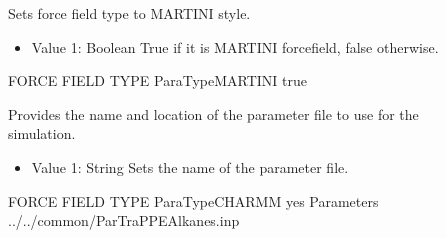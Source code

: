 \documentclass[letterpaper,10pt,english]{sphinxmanual}
\begin{document}
\begin{description}
\item[{}] \leavevmode
Sets force field type to MARTINI style.
\begin{itemize}
\item {} 
Value 1: Boolean \sphinxhyphen{} True if it is MARTINI forcefield, false otherwise.

\end{itemize}

\begin{sphinxVerbatim}[commandchars=\\\{\}]
\PYGZsh{}\PYGZsh{}\PYGZsh{}\PYGZsh{}\PYGZsh{}\PYGZsh{}\PYGZsh{}\PYGZsh{}\PYGZsh{}\PYGZsh{}\PYGZsh{}\PYGZsh{}\PYGZsh{}\PYGZsh{}\PYGZsh{}\PYGZsh{}\PYGZsh{}\PYGZsh{}\PYGZsh{}\PYGZsh{}\PYGZsh{}\PYGZsh{}\PYGZsh{}\PYGZsh{}\PYGZsh{}\PYGZsh{}\PYGZsh{}\PYGZsh{}\PYGZsh{}\PYGZsh{}\PYGZsh{}\PYGZsh{}\PYGZsh{}
\PYGZsh{} FORCE FIELD TYPE
\PYGZsh{}\PYGZsh{}\PYGZsh{}\PYGZsh{}\PYGZsh{}\PYGZsh{}\PYGZsh{}\PYGZsh{}\PYGZsh{}\PYGZsh{}\PYGZsh{}\PYGZsh{}\PYGZsh{}\PYGZsh{}\PYGZsh{}\PYGZsh{}\PYGZsh{}\PYGZsh{}\PYGZsh{}\PYGZsh{}\PYGZsh{}\PYGZsh{}\PYGZsh{}\PYGZsh{}\PYGZsh{}\PYGZsh{}\PYGZsh{}\PYGZsh{}\PYGZsh{}\PYGZsh{}\PYGZsh{}\PYGZsh{}\PYGZsh{}
ParaTypeMARTINI     true
\end{sphinxVerbatim}

\item[{}] \leavevmode
Provides the name and location of the parameter file to use for the simulation.
\begin{itemize}
\item {} 
Value 1: String \sphinxhyphen{} Sets the name of the parameter file.

\end{itemize}

\begin{sphinxVerbatim}[commandchars=\\\{\}]
\PYGZsh{}\PYGZsh{}\PYGZsh{}\PYGZsh{}\PYGZsh{}\PYGZsh{}\PYGZsh{}\PYGZsh{}\PYGZsh{}\PYGZsh{}\PYGZsh{}\PYGZsh{}\PYGZsh{}\PYGZsh{}\PYGZsh{}\PYGZsh{}\PYGZsh{}\PYGZsh{}\PYGZsh{}\PYGZsh{}\PYGZsh{}\PYGZsh{}\PYGZsh{}\PYGZsh{}\PYGZsh{}\PYGZsh{}\PYGZsh{}\PYGZsh{}\PYGZsh{}\PYGZsh{}\PYGZsh{}\PYGZsh{}\PYGZsh{}
\PYGZsh{} FORCE FIELD TYPE
\PYGZsh{}\PYGZsh{}\PYGZsh{}\PYGZsh{}\PYGZsh{}\PYGZsh{}\PYGZsh{}\PYGZsh{}\PYGZsh{}\PYGZsh{}\PYGZsh{}\PYGZsh{}\PYGZsh{}\PYGZsh{}\PYGZsh{}\PYGZsh{}\PYGZsh{}\PYGZsh{}\PYGZsh{}\PYGZsh{}\PYGZsh{}\PYGZsh{}\PYGZsh{}\PYGZsh{}\PYGZsh{}\PYGZsh{}\PYGZsh{}\PYGZsh{}\PYGZsh{}\PYGZsh{}\PYGZsh{}\PYGZsh{}\PYGZsh{}
ParaTypeCHARMM    yes
Parameters        ../../common/Par\PYGZus{}TraPPE\PYGZus{}Alkanes.inp
\end{sphinxVerbatim}


\end{description}
\end{document}
